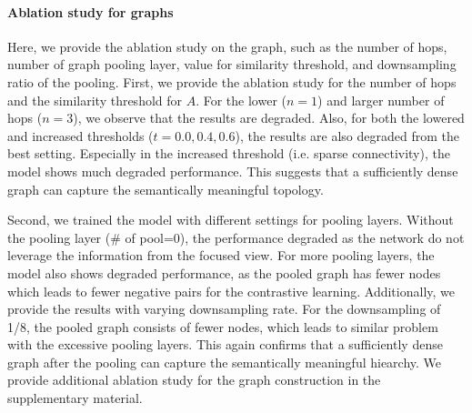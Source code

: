 \documentclass[letterpaper]{article} %
\begin{document}
\paragraph{Ablation study for graphs}
Here, we provide the ablation study on the graph,  such as the number of hops, number of graph pooling layer, value for similarity threshold, and downsampling ratio of the pooling.
First, we provide the ablation study for the number of hops and the similarity threshold for $A$. For the lower ($n=1$) and larger number of hops ($n=3$), we observe that the results are degraded. Also, for both the lowered and increased thresholds ($t=0.0, 0.4, 0.6$), the results are also degraded from the best setting.
Especially in the increased threshold (i.e. sparse connectivity), the model shows much degraded performance.
This suggests that a sufficiently dense graph can capture the semantically meaningful topology.

Second, we trained the model with different settings for pooling layers. Without the pooling layer (\# of pool=0), the performance degraded as the network do not leverage the information from the focused view. For more pooling layers, the model also shows degraded performance, as the pooled graph has fewer nodes which leads to fewer negative pairs for the contrastive learning. Additionally, we provide the results with varying downsampling rate. For the downsampling of 1/8, the pooled graph consists of fewer nodes, which leads to similar problem with the excessive pooling layers.
This again confirms that a sufficiently dense graph after the pooling can capture the semantically meaningful hiearchy.
We provide additional ablation study for the graph construction in the supplementary material.
\end{document}
